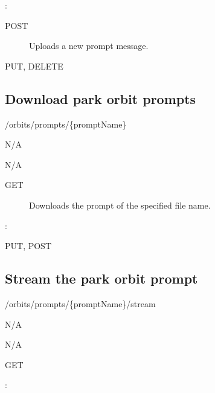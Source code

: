 \documentclass[letterpaper,10pt,english]{sphinxmanual}
\begin{document}
:

\begin{sphinxVerbatim}[commandchars=\\\{\}]
\end{sphinxVerbatim}
\begin{description}
\item[{ POST}] \leavevmode
Uploads a new prompt message.

\end{description}

 PUT, DELETE


\subsection{Download park orbit prompts}
\label{\detokenize{restapi:download-park-orbit-prompts}}
 /orbits/prompts/\{promptName\}

 N/A

 N/A
\begin{description}
\item[{ GET}] \leavevmode
Downloads the prompt of the specified file name.

\end{description}

:

\begin{sphinxVerbatim}[commandchars=\\\{\}]
\end{sphinxVerbatim}

 PUT, POST


\subsection{Stream the park orbit prompt}
\label{\detokenize{restapi:stream-the-park-orbit-prompt}}
 /orbits/prompts/\{promptName\}/stream

 N/A

 N/A

 GET

:
\end{document}
